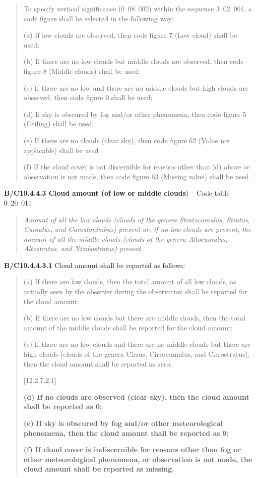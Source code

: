 \begin{quote}
To specify vertical significance (0~08~002) within the sequence 3~02~004, a code figure shall be selected in the following way:

(a) If low clouds are observed, then code figure 7 (Low cloud) shall be used;

(b) If there are no low clouds but middle clouds are observed, then code figure 8 (Middle clouds) shall be used;

(c) If there are no low and there are no middle clouds but high clouds are observed, then code figure 0 shall be used;

(d) If sky is obscured by fog and/or other phenomena, then code figure 5 (Ceiling) shall be used;

(e) If there are no clouds (clear sky), then code figure 62 (Value not applicable) shall be used

(f) If the cloud cover is not discernible for reasons other than (d) above or observation is not made, then code figure 63 (Missing value) shall be used.
\end{quote}

\textbf{B/C10.4.4.3 Cloud amount (of low or middle clouds}) -- Code table 0~20~011

\begin{quote}
\emph{Amount of all the low clouds (clouds of the genera Stratocumulus, Stratus, Cumulus, and Cumulonimbus) present or, if no low clouds are present, the amount of all the middle clouds (clouds of the genera Altocumulus, Altostratus, and Nimbostratus) present}.
\end{quote}

\textbf{B/C10.4.4.3.1} Cloud amount shall be reported as follows:

\begin{quote}
(a) If there are low clouds, then the total amount of all low clouds, as actually seen by the observer during the observation shall be reported for the cloud amount;

(b) If there are no low clouds but there are middle clouds, then the total amount of the middle clouds shall be reported for the cloud amount;

(c) If there are no low clouds and there are no middle clouds but there are high clouds (clouds of the genera Cirrus, Cirrocumulus, and Cirrostratus), then the cloud amount shall be reported as zero;

{[}12.2.7.2.1{]}

\textbf{(d) If no clouds are observed (clear sky), then the cloud amount shall be reported as 0;}

\textbf{(e) If sky is obscured by fog and/or other meteorological phenomena, then the cloud amount shall be reported as 9;}

\textbf{(f) If cloud cover is indiscernible for reasons other than fog or other meteorological phenomena, or observation is not made, the cloud amount shall be reported as missing.}
\end{quote}

